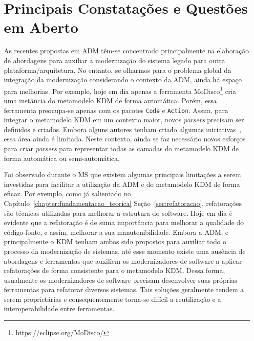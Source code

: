 \section{Principais Constatações e Questões em Aberto}

As recentes propostas em ADM têm-se concentrado principalmente na elaboração de abordagens para auxiliar a modernização do sistema legado para outra plataforma/arquitetura. No entanto, se olharmos para o problema global da integração da modernização considerando o contexto da ADM, ainda há espaço para melhorias. Por exemplo, hoje em dia apenas a ferramenta MoDisco\footnote{https://eclipse.org/MoDisco/} cria uma instância do metamodelo KDM de forma automática. Porém, essa ferramenta preocupa-se apenas com os pacotes \texttt{Code} e \texttt{Action}. Assim, para integrar o metamodelo KDM em um contexto maior, novos \textit{parsers} precisam ser definidos e criados. Embora alguns autores tenham criado algumas iniciativas~\cite{5440163,Bruneliere_2010MODISCO}, essa área ainda é limitada. Neste contexto, ainda se faz necessário novos esforços para criar \textit{parsers} para representar todas as camadas do metamodelo KDM de forma automática ou semi-automática.

Foi observado durante o MS que existem algumas principais limitações a serem investidas para facilitar a utilização da ADM e do metamodelo KDM de forma eficaz. Por exemplo, como já salientado no Capítulo~\ref{chapter:fundamentacao_teorica} Seção~\ref{sec:refatoracao}, refatorações são técnicas utilizadas para melhorar a estrutura do software. Hoje em dia é evidente que a refatoração é de suma importância para melhorar a qualidade do código-fonte, e assim, melhorar a sua manutenibilidade.
Embora a ADM, e principalmente o KDM tenham ambos sido propostos para auxiliar todo o processo da modernização de sistemas, até esse momento existe uma ausência de abordagens e ferramentas que auxiliem os modernizadores de software a aplicar refatorações de forma consistente para o metamodelo KDM. Dessa forma, usualmente os modernizadores de software precisam desenvolver suas próprias ferramentas para refatorar diversos sistemas. Tais soluções geralmente tendem a serem proprietárias e consequentemente torna-se difícil a reutilização e a interoperabilidade entre ferramentas.

